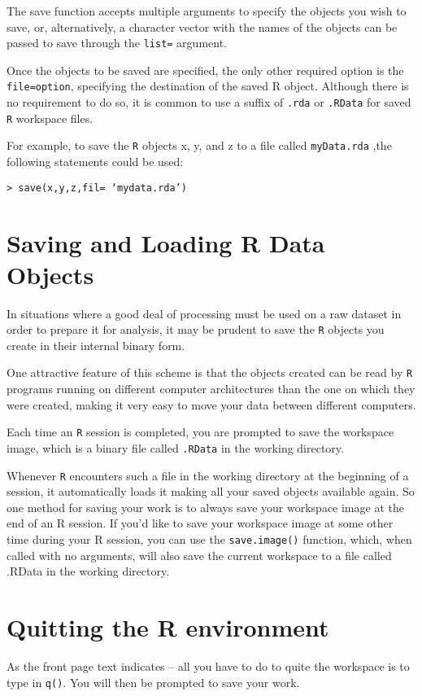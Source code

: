 \documentclass{article}
\begin{document}
The save function accepts multiple arguments to specify the objects you wish to save, or, alternatively, a character vector with the names of the objects can be passed to save through the \texttt{list=} argument. 

Once the objects to be saved are specified, the only other required option is the \texttt{file=option}, specifying the destination of the saved R object. Although there is no requirement to do so, it is common to use a suffix of \texttt{.rda} or \texttt{.RData} for saved \texttt{R} workspace files.

For example, to save the \texttt{R} objects x, y, and z to a file called \texttt{myData.rda} ,the following statements could be used:

\begin{verbatim}
> save(x,y,z,fil= ‘mydata.rda’)
\end{verbatim}

\section{Saving and Loading R Data Objects}
In situations where a good deal of processing must be used on a raw dataset in order to prepare it for analysis, it may be prudent to save the \texttt{R} objects you create in their internal binary form. 

One attractive feature of this scheme is that the objects created can be read by \texttt{R} programs running on different computer architectures than the one on which they were created, making it very easy to move your data between different computers. 

Each time an \texttt{R} session is completed, you are prompted to save the workspace image, which is a binary file called \texttt{.RData} in the working directory. 

Whenever \texttt{R} encounters such a file in the working directory at the beginning of a session, it automatically loads it making all your saved objects available again. 
So one method for saving your work is to always save your workspace image at the end of an R session. If you’d like to save your workspace image at some other time during your R session, you can use the \texttt{save.image()} function, which, when called with no arguments, will also save the current workspace to a file called .RData in the working directory.
\section{Quitting the R environment}
As the front page text indicates – all you have to do to quite the workspace is to type in \texttt{q()}. You will then be prompted to save your work.
\end{document}
